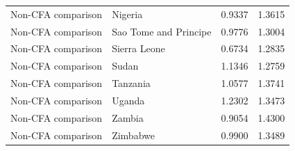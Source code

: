 \begin{table}
\begin{tabular}[t]{llrr}
Non-CFA comparison & Nigeria & 0.9337 & 1.3615\\
Non-CFA comparison & Sao Tome and Principe & 0.9776 & 1.3004\\
Non-CFA comparison & Sierra Leone & 0.6734 & 1.2835\\
\addlinespace
Non-CFA comparison & Sudan & 1.1346 & 1.2759\\
Non-CFA comparison & Tanzania & 1.0577 & 1.3741\\
Non-CFA comparison & Uganda & 1.2302 & 1.3473\\
Non-CFA comparison & Zambia & 0.9054 & 1.4300\\
Non-CFA comparison & Zimbabwe & 0.9900 & 1.3489\\
\bottomrule
\end{tabular}
\end{table}